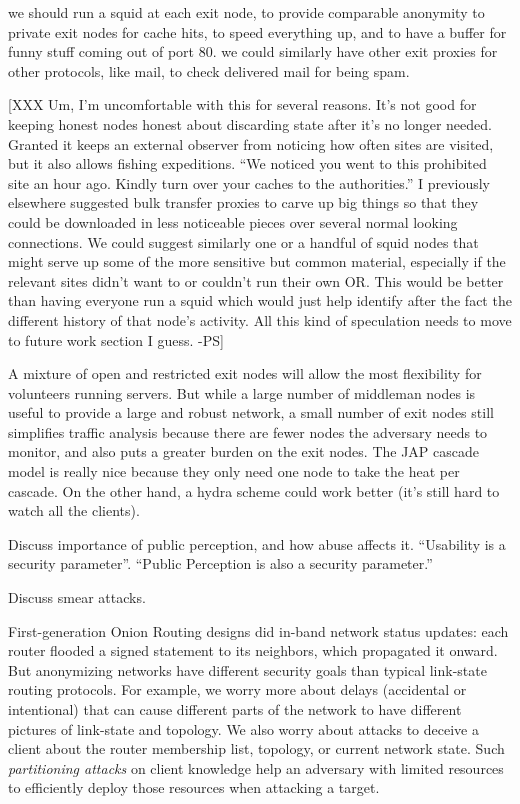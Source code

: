 \documentclass[times,10pt,twocolumn]{article}
\begin{document}
we should run a squid at each exit node, to provide comparable anonymity
to private exit nodes for cache hits, to speed everything up, and to
have a buffer for funny stuff coming out of port 80. we could similarly
have other exit proxies for other protocols, like mail, to check
delivered mail for being spam.

[XXX Um, I'm uncomfortable with this for several reasons.
It's not good for keeping honest nodes honest about discarding
state after it's no longer needed. Granted it keeps an external
observer from noticing how often sites are visited, but it also
allows fishing expeditions. ``We noticed you went to this prohibited
site an hour ago. Kindly turn over your caches to the authorities.''
I previously elsewhere suggested bulk transfer proxies to carve
up big things so that they could be downloaded in less noticeable
pieces over several normal looking connections. We could suggest
similarly one or a handful of squid nodes that might serve up
some of the more sensitive but common material, especially if
the relevant sites didn't want to or couldn't run their own OR.
This would be better than having everyone run a squid which would
just help identify after the fact the different history of that
node's activity. All this kind of speculation needs to move to
future work section I guess. -PS]

A mixture of open and restricted exit nodes will allow the most
flexibility for volunteers running servers. But while a large number
of middleman nodes is useful to provide a large and robust network,
a small number of exit nodes still simplifies traffic analysis because
there are fewer nodes the adversary needs to monitor, and also puts a
greater burden on the exit nodes.
The JAP cascade model is really nice because they only need one node to
take the heat per cascade. On the other hand, a hydra scheme could work
better (it's still hard to watch all the clients).

Discuss importance of public perception, and how abuse affects it.
``Usability is a security parameter''.  ``Public Perception is also a
security parameter.''

Discuss smear attacks.

\label{subsec:dirservers}

First-generation Onion Routing designs \cite{or-jsac98,freedom2-arch} did
in-band network status updates: each router flooded a signed statement
to its neighbors, which propagated it onward. But anonymizing networks
have different security goals than typical link-state routing protocols.
For example, we worry more about delays (accidental or intentional)
that can cause different parts of the network to have different pictures
of link-state and topology. We also worry about attacks to deceive a
client about the router membership list, topology, or current network
state. Such \emph{partitioning attacks} on client knowledge help an
adversary with limited resources to efficiently deploy those resources
when attacking a target.
\end{document}
